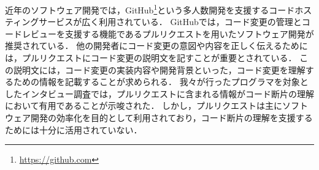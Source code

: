 
近年のソフトウェア開発では，GitHub\footnote{\url{https://github.com}}という多人数開発を支援するコードホスティングサービスが広く利用されている．
GitHubでは，コード変更の管理とコードレビューを支援する機能であるプルリクエストを用いたソフトウェア開発が推奨されている．
他の開発者にコード変更の意図や内容を正しく伝えるためには，プルリクエストにコード変更の説明文を記すことが重要とされている．
この説明文には，コード変更の実装内容や開発背景といった，コード変更を理解するための情報を記載することが求められる．
我々が行ったプログラマを対象としたインタビュー調査では，プルリクエストに含まれる情報がコード断片の理解において有用であることが示唆された．
しかし，プルリクエストは主にソフトウェア開発の効率化を目的として利用されており，コード断片の理解を支援するためには十分に活用されていない．






